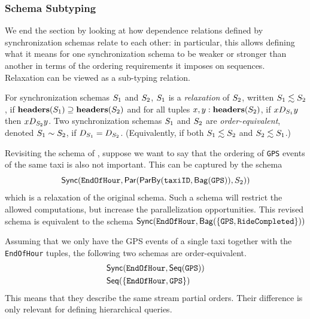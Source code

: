 \subsubsection{Schema Subtyping}

We end the section by looking at how dependence relations defined
by synchronization schemas relate to each other: in particular, this allows defining what it means
for one synchronization schema to be weaker or stronger than another in terms of the ordering requirements it imposes on sequences.
Relaxation can be viewed as a sub-typing relation.

\begin{definition}
    \label{def:schema-relaxation}
    \label{def:schema-equivalence}
    For synchronization schemas $\ss_1$ and $\ss_2$,  $\ss_1$ is a \emph{relaxation} of $\ss_2$, written $\ss_1 \lesssim \ss_2$, if
    $\headers(\ss_1) \supseteq \headers(\ss_2)$
    and for all tuples $x, y: \headers(\ss_2)$,
    if $x D_{\ss_1} y$ then $x D_{\ss_2} y$.
    Two synchronization schemas $\ss_1$ and $\ss_2$ are \emph{order-equivalent}, denoted $\ss_1 \sim \ss_2$, if $D_{\ss_1} = D_{\ss_2}$.
    (Equivalently, if both $\ss_1 \lesssim \ss_2$ and $\ss_2 \lesssim \ss_1$.)
    \end{definition}

\begin{example}
Revisiting the schema of , suppose we want to say that
the ordering of \texttt{GPS} events of the same taxi is also not important.
This can be captured by the schema
$$
\hier
    {\texttt{EndOfHour}}
    {\parcomp
        {\keyby
            {\texttt{taxiID}}
            {\relleaf{\texttt{GPS}}}}
        {\ss_2}}
$$
which is a relaxation of the original schema.
Such a schema will
restrict the allowed computations, but increase the parallelization opportunities.
This revised schema is equivalent to the schema
$\hier{\texttt{EndOfHour}}{\relleaf{\{\texttt{GPS},\texttt{RideCompleted} \}}}$

Assuming that we only have the GPS events of a single taxi together with the \texttt{EndOfHour} tuples, the following two schemas are order-equivalent.
\begin{align*}
    & \hier
        { \texttt{EndOfHour}  }
        {\seqleaf
            {  \texttt{GPS} }} \\
    & \seqleaf
        {\{ \texttt{EndOfHour}, \texttt{GPS} \} }
\end{align*}
This means that they describe the same stream partial orders. Their difference is only relevant for defining hierarchical queries.
\end{example}

